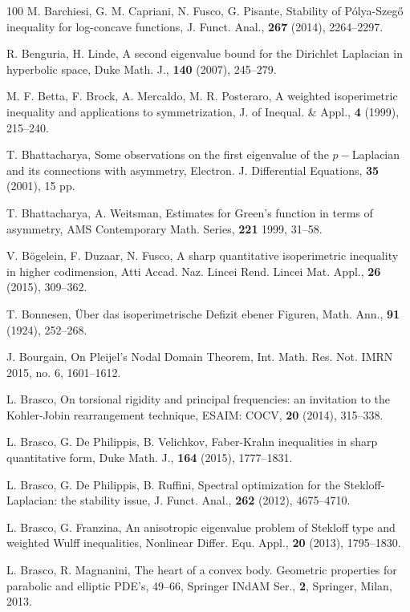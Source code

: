 \documentclass{amsart}
\theoremstyle{definition}
\numberwithin{equation}{section}
\begin{document}
\begin{thebibliography}{100}
 M. Barchiesi, G. M. Capriani, N. Fusco, G. Pisante, Stability of P\'olya-Szeg\H{o} inequality for log-concave functions, J. Funct. Anal., {\bf 267} (2014), 2264--2297. 

 R. Benguria, H. Linde, A second eigenvalue bound for the
Dirichlet Laplacian in hyperbolic space, Duke Math. J., {\bf 140} (2007), 245--279.

 M. F. Betta, F. Brock, A. Mercaldo, M. R. Posteraro, A weighted isoperimetric inequality and applications to symmetrization, J. of Inequal. \& Appl., {\bf 4} (1999), 215--240. 

 T. Bhattacharya, Some observations on the first eigenvalue of the $p-$Laplacian and its connections with asymmetry, Electron. J. Differential Equations, {\bf 35} (2001), 15 pp.

 T. Bhattacharya, A. Weitsman, Estimates for Green's function in terms of asymmetry,
AMS Contemporary Math. Series, {\bf 221} 1999, 31--58.

 V. B\"ogelein, F. Duzaar, N. Fusco, A sharp quantitative isoperimetric inequality in higher codimension, Atti Accad. Naz. Lincei Rend. Lincei Mat. Appl., {\bf 26} (2015), 309--362.

 T. Bonnesen, \"Uber das isoperimetrische Defizit ebener Figuren, Math. Ann., {\bf 91} (1924), 252--268.

 J. Bourgain, On Pleijel's Nodal Domain Theorem, Int. Math. Res. Not. IMRN 2015, no. 6, 1601--1612.

 L. Brasco, On torsional rigidity and principal frequencies: an invitation to the Kohler-Jobin rearrangement technique, ESAIM: COCV, {\bf 20} (2014), 315--338.


 L. Brasco, G. De Philippis, B. Velichkov, Faber-Krahn inequalities in sharp quantitative form, Duke Math. J., {\bf 164} (2015), 1777--1831.

 L. Brasco, G. De Philippis, B. Ruffini, Spectral optimization for the Stekloff-Laplacian: the stability issue, J. Funct. Anal., {\bf 262} (2012), 4675--4710.

 L. Brasco, G. Franzina, An anisotropic eigenvalue problem of Stekloff type and weighted Wulff inequalities, Nonlinear Differ. Equ. Appl., {\bf 20} (2013), 1795--1830.

 L. Brasco, R. Magnanini, The heart of a convex body. Geometric properties for parabolic and elliptic PDE's, 49--66,
Springer INdAM Ser., {\bf 2}, Springer, Milan, 2013. 


\end{thebibliography}
\end{document}
